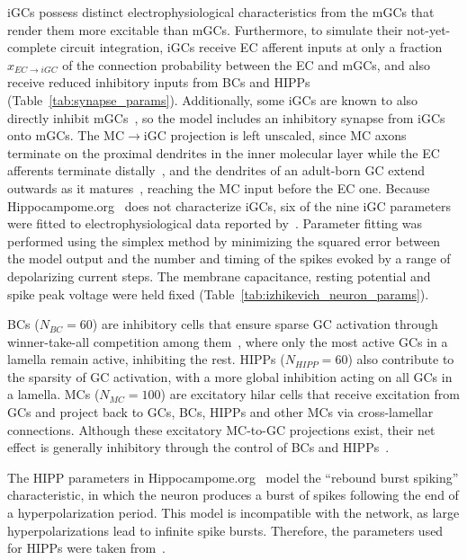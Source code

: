 iGCs possess distinct electrophysiological characteristics from the mGCs that render them more excitable than mGCs. Furthermore,
to simulate their not-yet-complete circuit integration, iGCs receive EC afferent inputs at only a fraction $x_{EC \to iGC}$ of the
connection probability between the EC and mGCs, and also receive reduced inhibitory inputs from BCs and HIPPs
(Table~\ref{tab:synapse_params}). Additionally, some iGCs are known to also directly inhibit mGCs~\parencite{lunaAdultborn2019}, so
the model includes an inhibitory synapse from iGCs onto mGCs. The MC$\to$iGC projection is left unscaled, since MC axons terminate
on the proximal dendrites in the inner molecular layer while the EC afferents terminate
distally~\parencite{amaralDentate2007}, and the dendrites of an adult-born GC extend outwards as it
matures~\parencite{zhaoDistinct2006}, reaching the MC input before the EC one. Because
Hippocampome.org~\parencite{wheelerHippocampomeorg2023} does not characterize iGCs, six of the nine iGC parameters were fitted to
electrophysiological data reported by~\textcite{espositoNeuronal2005}. Parameter fitting was performed using the
\textcite{nelderSimplex1965} simplex method by minimizing the squared error between the model output and the number and timing of
the spikes evoked by a range of depolarizing current steps. The membrane capacitance, resting potential and spike peak voltage were
held fixed (Table~\ref{tab:izhikevich_neuron_params}).

BCs ($N_{BC} = 60$) are inhibitory cells that ensure sparse GC activation through winner-take-all competition among
them~\parencite{coultripCortical1992, chavlisDendrites2017, kimAdult2024}, where only the most active GCs in a lamella remain active,
inhibiting the rest. HIPPs ($N_{HIPP} = 60$) also contribute to the sparsity of GC activation, with a more global inhibition
acting on all GCs in a lamella. MCs ($N_{MC} = 100$) are excitatory hilar cells that receive excitation from GCs and project
back to GCs, BCs, HIPPs and other MCs via cross-lamellar connections. Although these excitatory MC-to-GC projections exist, their
net effect is generally inhibitory through the control of BCs and HIPPs~\parencite{myersRole2009, scharfmanHilar2013}.

The HIPP parameters in Hippocampome.org~\parencite{wheelerHippocampomeorg2023} model the ``rebound burst spiking'' characteristic,
in which the neuron produces a burst of spikes following the end of a hyperpolarization period. This model is incompatible with
the network, as large hyperpolarizations lead to infinite spike bursts. Therefore, the parameters used for HIPPs were taken
from~\textcite{modakIzhikevich2018}.

